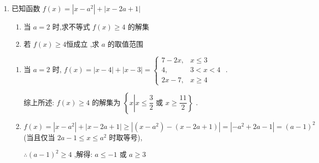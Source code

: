 \begin{enumerate}
\begin{jieda}
\begin{enumerate}
            综上, $m \leq \dfrac{5}{4}$
        \end{enumerate}
    \end{jieda}
    \item 已知函数 $f\left( x\right)  = \left| {x - {a}^{2}}\right|  + \left| {x - {2a} + 1}\right|$
    \begin{enumerate}
        \item 当 $a = 2$ 时,求不等式 $f\left( x\right)  \geq  4$ 的解集
        \item 若 $f\left( x\right)  \geq  4$恒成立 ,求 $a$ 的取值范围
    \end{enumerate}
    \begin{jieda}
        \begin{enumerate}
        \item 当 $a = 2$ 时, $f\left( x\right)  = \left| {x - 4}\right|  + \left| {x - 3}\right| = \left\{\begin{array}{ll}
             7 - {2x}, & x \leq  3  \\
             4, & 3 < x < 4 \\
             {2x} - 7, & x \geq  4
        \end{array}\right.$ .
        
        综上所述: $f\left( x\right)  \geq  4$ 的解集为 $\left\{  x \left |  x \leq  \dfrac{3}{2}\right. \right.$ 或 $\left. {x \geq  \dfrac{11}{2}}\right\}$ .
        \item $f\left( x\right)  = \left| {x - {a}^{2}}\right|  + \left| {x - {2a} + 1}\right|  \geq  \left| {\left( {x - {a}^{2}}\right)  - \left( {x - {2a} + 1}\right) }\right|  = \left| {-{a}^{2} + {2a} - 1}\right|  = {\left( a - 1\right) }^{2}$ (当且仅当 ${2a} - 1 \leq  x \leq  {a}^{2}$ 时取等号),
        
        $\therefore {\left( a - 1\right) }^{2} \geq  4$ ,解得: $a \leq   - 1$ 或 $a \geq  3$
    \end{enumerate}
    \end{jieda}
    

\end{enumerate}

